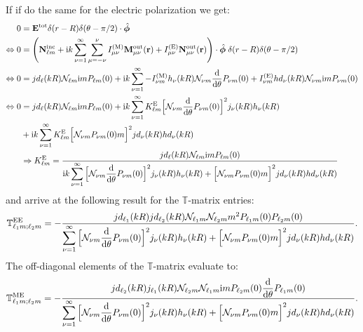 If if do the same for the electric polarization we get:
\begin{align}
0&=\mathbf{E}^\mathrm{tot}\delta(r-R)\delta(\theta-\pi/2)\cdot \hat{\bm{\phi}} \\
\nonumber
\Leftrightarrow 0&=\left(\mathbf{N}^\mathrm{inc}_{\ell m} + \mathrm{i} k \sum_{\nu=1}^\infty  \sum_{\mu=-\nu}^\nu
I_{\mu \nu}^\mathrm{(M)}\mathbf{M}^\mathrm{out}_{\mu \nu}(\mathbf{r})+
I_{\mu \nu}^\mathrm{(E)}\mathbf{N}^\mathrm{out}_{\mu \nu}(\mathbf{r})\right) \cdot \hat{\bm{\phi}}
\;\delta(r-R)\delta(\theta-\pi/2)\\
\nonumber
\Leftrightarrow 0&=
jd_\ell(kR)\mathcal{N}_{\ell m}\mathrm{i} m P_{\ell m}(0) 
+
\mathrm{i} k \sum_{\nu=1}^\infty  
-I_{\nu m}^\mathrm{(M)}
h_\nu(kR)\mathcal{N}_{\nu m}\frac{\mathrm{d}}{\mathrm{d}\theta}P_{\nu m}(0) 
+
I_{\nu m}^\mathrm{(E)}
hd_\nu(kR)\mathcal{N}_{\nu m}\mathrm{i} m  P_{\nu m}(0) \\ \nonumber
\Leftrightarrow
0 &= jd_\ell(kR)\mathcal{N}_{\ell m}\mathrm{i} m P_{\ell m}(0) 
+ \mathrm{i} k\sum_{\nu = 1}^\infty
K^\mathrm{E}_{\ell m}\Big[
\mathcal{N}_{\nu m} \frac{\mathrm{d}}{\mathrm{d} \theta}P_{\nu m}(0)
\Big]^2 j_\nu(kR) h_\nu(kR)
\\ \nonumber
&+ \mathrm{i} k\sum_{\nu = 1}^\infty
K^\mathrm{E}_{\ell m} \Big[
\mathcal{N}_{\nu m} P_{\nu m}(0) m
\Big]^2jd_\nu(kR) hd_\nu(kR)
\\ \nonumber
&\Rightarrow K^\mathrm{E}_{\ell m} = \frac{jd_\ell(kR) \mathcal{N}_{\ell m}\mathrm{i} mP_{\ell m}(0)}{\mathrm{i} k \displaystyle \sum_{\nu=1}^\infty
\Big[
\mathcal{N}_{\nu m} \frac{\mathrm{d}}{\mathrm{d} \theta}P_{\nu m}(0)
\Big]^2 j_\nu(kR) h_\nu(kR)
+
\Big[
\mathcal{N}_{\nu m} P_{\nu m}(0) m
\Big]^2jd_\nu(kR) hd_\nu(kR)
}
\end{align}
and arrive at the following result for the $\mathbb{T}$-matrix entries:
\begin{equation}
\mathbb{T}^\mathrm{EE}_{\ell_1 m;\ell_2 m} = -
\frac{jd_{\ell_1}(kR)jd_{\ell_2}(kR) 
\mathcal{N}_{\ell_1 m}\mathcal{N}_{\ell_2 m}
m^2P_{\ell_1 m}(0)P_{\ell_2 m}(0)}{\displaystyle \sum_{\nu=1}^\infty
\Big[
\mathcal{N}_{\nu m} \frac{\mathrm{d}}{\mathrm{d} \theta}P_{\nu m}(0)
\Big]^2 j_\nu(kR) h_\nu(kR)
+
\Big[
\mathcal{N}_{\nu m} P_{\nu m}(0) m
\Big]^2jd_\nu(kR) hd_\nu(kR)
}.
\end{equation}
The off-diagonal elements of the $\mathbb{T}$-matrix evaluate to:
\begin{equation}
\mathbb{T}^\mathrm{ME}_{\ell_1 m;\ell_2 m} = -
\frac{jd_{\ell_2}(kR) j_{\ell_1}(kR)
\mathcal{N}_{\ell_2 m}\mathcal{N}_{\ell_1 m}
\mathrm{i} mP_{\ell_2 m}(0)\dfrac{\mathrm{d}}{\mathrm{d} \theta}P_{\ell_1 m}(0)
}{\displaystyle \sum_{\nu=1}^\infty
\Big[
\mathcal{N}_{\nu m} \frac{\mathrm{d}}{\mathrm{d} \theta}P_{\nu m}(0)
\Big]^2 j_\nu(kR) h_\nu(kR)
+
\Big[
\mathcal{N}_{\nu m} P_{\nu m}(0) m
\Big]^2jd_\nu(kR) hd_\nu(kR)
}.
\end{equation}
